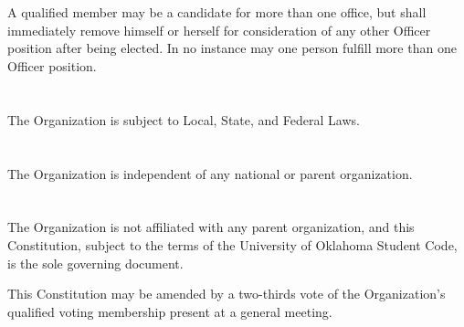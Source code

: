 \documentclass[12pt]{cls/constitution}
\begin{document}
\section{}
A qualified member may be a candidate for more than one office, but shall immediately remove himself or herself for consideration of any other Officer position after being elected. In no instance may one person fulfill more than one Officer position. 


\section{}
The Organization is  subject to Local, State, and Federal Laws.

\section{}
The Organization is independent of any national or
parent organization.

\section{}
The Organization is not affiliated with any parent organization, and this Constitution, subject to the terms of the University of Oklahoma Student Code, is the sole governing document.

This Constitution may be amended by a two-thirds vote of the Organization’s qualified voting membership present at a general meeting. 
\end{document}
